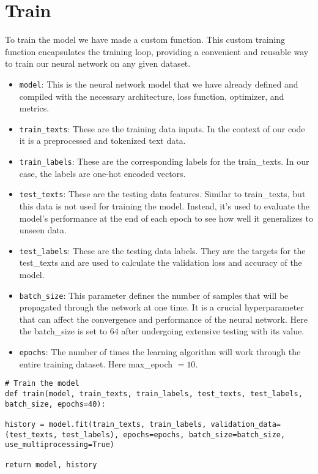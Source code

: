 \section{Train}
To train the model we have made a custom function. This custom training function encapsulates the training loop, providing a convenient and reusable way to train our neural network on any given dataset.

\begin{itemize}
	\item \verb*|model|: This is the neural network model that we have already defined and compiled with the necessary architecture, loss function, optimizer, and metrics.
	
	\item \verb*|train_texts|: These are the training data inputs. In the context of our code it is a preprocessed and tokenized text data.
	
	\item \verb*|train_labels|: These are the corresponding labels for the train\_texts. In our case, the labels are one-hot encoded vectors.
	
	\item \verb*|test_texts|: These are the testing data features. Similar to train\_texts, but this data is not used for training the model. Instead, it's used to evaluate the model's performance at the end of each epoch to see how well it generalizes to unseen data.
	
	\item \verb*|test_labels|: These are the testing data labels. They are the targets for the test\_texts and are used to calculate the validation loss and accuracy of the model.
	
	\item \verb*|batch_size|: This parameter defines the number of samples that will be propagated through the network at one time. It is a crucial hyperparameter that can affect the convergence and performance of the neural network. Here the batch\_size is set to $64$ after undergoing extensive testing with its value.
	
	\item \verb*|epochs|: The number of times the learning algorithm will work through the entire training dataset. Here max\_epoch $= 10$.
\end{itemize}

\begin{lstlisting}
# Train the model
def train(model, train_texts, train_labels, test_texts, test_labels, batch_size, epochs=40):

history = model.fit(train_texts, train_labels, validation_data=(test_texts, test_labels), epochs=epochs, batch_size=batch_size, use_multiprocessing=True)

return model, history
\end{lstlisting}

